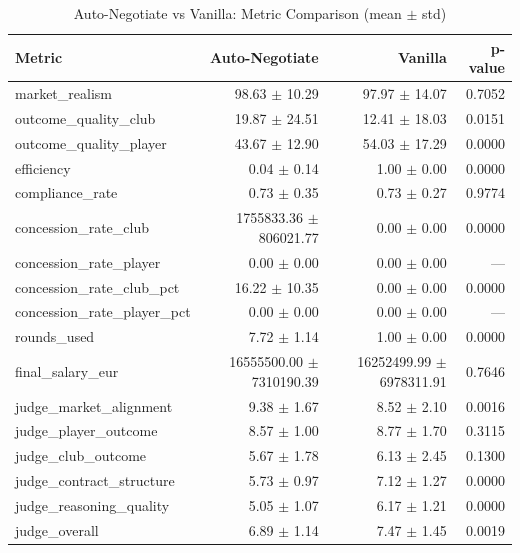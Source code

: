 \begin{table}[h]
\centering
\caption{Auto-Negotiate vs Vanilla: Metric Comparison (mean $\pm$ std)}
\label{tab:comparison}
\begin{tabular}{lrrr}
\hline
\textbf{Metric} & \textbf{Auto-Negotiate} & \textbf{Vanilla} & \textbf{p-value} \\
\hline
market\_realism & 98.63 $\pm$ 10.29 & 97.97 $\pm$ 14.07 & 0.7052 \\
outcome\_quality\_club & 19.87 $\pm$ 24.51 & 12.41 $\pm$ 18.03 & 0.0151 \\
outcome\_quality\_player & 43.67 $\pm$ 12.90 & 54.03 $\pm$ 17.29 & 0.0000 \\
efficiency & 0.04 $\pm$ 0.14 & 1.00 $\pm$ 0.00 & 0.0000 \\
compliance\_rate & 0.73 $\pm$ 0.35 & 0.73 $\pm$ 0.27 & 0.9774 \\
concession\_rate\_club & 1755833.36 $\pm$ 806021.77 & 0.00 $\pm$ 0.00 & 0.0000 \\
concession\_rate\_player & 0.00 $\pm$ 0.00 & 0.00 $\pm$ 0.00 & --- \\
concession\_rate\_club\_pct & 16.22 $\pm$ 10.35 & 0.00 $\pm$ 0.00 & 0.0000 \\
concession\_rate\_player\_pct & 0.00 $\pm$ 0.00 & 0.00 $\pm$ 0.00 & --- \\
rounds\_used & 7.72 $\pm$ 1.14 & 1.00 $\pm$ 0.00 & 0.0000 \\
final\_salary\_eur & 16555500.00 $\pm$ 7310190.39 & 16252499.99 $\pm$ 6978311.91 & 0.7646 \\
judge\_market\_alignment & 9.38 $\pm$ 1.67 & 8.52 $\pm$ 2.10 & 0.0016 \\
judge\_player\_outcome & 8.57 $\pm$ 1.00 & 8.77 $\pm$ 1.70 & 0.3115 \\
judge\_club\_outcome & 5.67 $\pm$ 1.78 & 6.13 $\pm$ 2.45 & 0.1300 \\
judge\_contract\_structure & 5.73 $\pm$ 0.97 & 7.12 $\pm$ 1.27 & 0.0000 \\
judge\_reasoning\_quality & 5.05 $\pm$ 1.07 & 6.17 $\pm$ 1.21 & 0.0000 \\
judge\_overall & 6.89 $\pm$ 1.14 & 7.47 $\pm$ 1.45 & 0.0019 \\
\hline
\end{tabular}
\end{table}